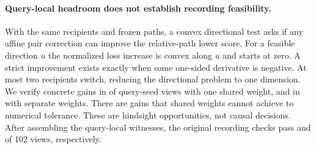 \paragraph{Query-local headroom does not establish recording feasibility.}
With the same recipients and frozen paths, a convex
directional test asks if any affine pair correction can
improve the relative-path lower score. For a feasible
direction $u$ the normalized loss increase is convex along
$u$ and starts at zero. A strict improvement exists exactly
when some one-sided derivative is negative. At most two
recipients switch, reducing the directional problem to one
dimension. We verify concrete gains in \DirectionShared{}
of \DirectionQueries{} query-seed views with one shared
weight, and in \DirectionSeparate{} with separate weights.
There are \DirectionOnly{} gains that shared weights cannot
achieve to numerical tolerance. These are hindsight
opportunities, not causal decisions. After assembling the
query-local witnesses, the original recording checks pass
\DirectionSharedPass{} and \DirectionSeparatePass{} of 102 views,
respectively.
